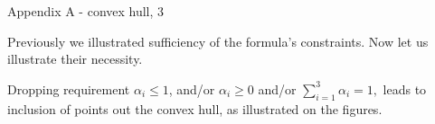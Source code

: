 \documentclass{beamer}
\begin{document}
\begin{frame}{Appendix A - convex hull, 3}
	\begin{flushleft}
		
		
					\begin{figure}
							\begin{subfigure}{.5\textwidth}
									\centering
									\resizebox{.95\textwidth}{!}
									{}
								\end{subfigure}%
							\begin{subfigure}{.5\textwidth}
									\centering
									\resizebox{.95\textwidth}{!}
									{}
								\end{subfigure}
						\end{figure}
		
		Previously we illustrated sufficiency of the formula's constraints. Now let us illustrate their necessity.
		
		\bigskip
		
		Dropping requirement $\alpha_i \leq 1$, and/or $\alpha_i \geq 0$ and/or $\sum\limits_{i=1}^{3} \alpha_i = 1,$ leads to inclusion of points out the convex hull, as illustrated on the figures.
		
		
	\end{flushleft}
\end{frame}
\end{document}

